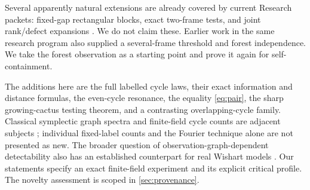 Several apparently natural extensions are already covered by current Research
packets: fixed-gap rectangular blocks, exact two-frame tests, and joint
rank/defect expansions \cite{ProveItTwo,ProveItRect}. We do not claim these.
Earlier work in the same research program also supplied a several-frame
threshold and forest independence. We take the forest observation as a starting
point and prove it again for self-containment.

The additions here are the full labelled cycle laws, their exact information and
distance formulas, the even-cycle resonance, the equality \eqref{eq:pair}, the
sharp growing-cactus testing theorem, and a contrasting overlapping-cycle family.
Classical symplectic graph spectra and finite-field cycle counts are adjacent
subjects \cite{TangWan,IJM,Bright}; individual fixed-label counts and the Fourier
technique alone are not presented as new. The broader question of
observation-graph-dependent detectability also has an established counterpart
for real Wishart models \cite{BBH}. Our statements specify an exact finite-field
experiment and its explicit critical profile. The novelty assessment is scoped
in \cref{sec:provenance}.

